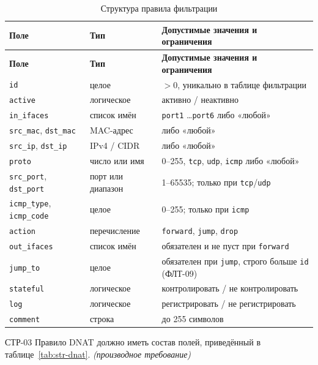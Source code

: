 \documentclass[12pt,a4paper,final]{article}
\newenvironment{reqs}
  {\begin{description}[style=sameline,leftmargin=2.2cm,labelwidth=2.0cm,
     labelsep=0.2cm,font=\normalfont\bfseries,itemsep=3pt]}
  {\end{description}}
\newcommand{\der}{\textit{(производное требование)}}
\begin{document}
{\small
\begin{longtable}{|L{3.6cm}|L{3.3cm}|L{7.2cm}|}
\caption{Структура правила фильтрации}\label{tab:str-filter}\\
\hline
\textbf{Поле} & \textbf{Тип} & \textbf{Допустимые значения и ограничения}\\
\hline\endfirsthead
\hline
\textbf{Поле} & \textbf{Тип} & \textbf{Допустимые значения и ограничения}\\
\hline\endhead
\texttt{id} & целое & $>0$, уникально в таблице фильтрации\\ \hline
\texttt{active} & логическое & активно / неактивно\\ \hline
\texttt{in\_ifaces} & список имён & \texttt{port1} \dots \texttt{port6} либо «любой»\\ \hline
\texttt{src\_mac}, \texttt{dst\_mac} & MAC-адрес & либо «любой»\\ \hline
\texttt{src\_ip}, \texttt{dst\_ip} & IPv4 / CIDR & либо «любой»\\ \hline
\texttt{proto} & число или имя & 0--255, \texttt{tcp}, \texttt{udp}, \texttt{icmp} либо «любой»\\ \hline
\texttt{src\_port}, \texttt{dst\_port} & порт или диапазон & 1--65535; только при \texttt{tcp}/\texttt{udp}\\ \hline
\texttt{icmp\_type}, \texttt{icmp\_code} & целое & 0--255; только при \texttt{icmp}\\ \hline
\texttt{action} & перечисление & \texttt{forward}, \texttt{jump}, \texttt{drop}\\ \hline
\texttt{out\_ifaces} & список имён & обязателен и не пуст при \texttt{forward}\\ \hline
\texttt{jump\_to} & целое & обязателен при \texttt{jump}, строго больше \texttt{id} (ФЛТ-09)\\ \hline
\texttt{stateful} & логическое & контролировать / не контролировать\\ \hline
\texttt{log} & логическое & регистрировать / не регистрировать\\ \hline
\texttt{comment} & строка & до 255 символов\\ \hline
\end{longtable}
}
 
\begin{reqs}
\item[СТР-03] Правило DNAT должно иметь состав полей, приведённый в
  таблице~\ref{tab:str-dnat}. \der
\end{reqs}
 
\end{document}
